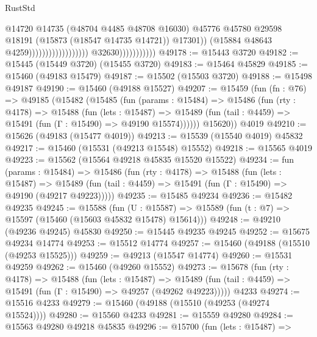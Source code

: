 \begin{lexlean}{RustStd}
\begin{coremodule}
                                                                @14720
                                                                @14735
                                                                (@48704 @4485 @48708 @16030)
                                                                @45776
                                                                @45780
                                                                @29598
                                                                @18191
                                                                (@15873 (@18547 @14735 @14721))
                                                                @17301))
                                                            (@15884 @48643 @4259))))))))))))))))))
                          @32630)))))))))))
@49178 := @15443 @3720
@49182 := @15445 (@15449 @3720) (@15455 @3720)
@49183 := @15464 @45829
@49185 := @15460 (@49183 @15479)
@49187 := @15502 (@15503 @3720)
@49188 := @15498 @49187
@49190 := @15460 (@49188 @15527)
@49207 := @15459
    (fun (fn : @76) =>
    @49185
      (@15482
        (@15485
          (fun (params : @15484) =>
          @15486
            (fun (rty : @4178) =>
            @15488
              (fun (lets : @15487) =>
              @15489 (fun (tail : @4459) => @15491 (fun (Γ : @15490) => @49190 @15574))))))
        @15620))
    @4019
@49210 := @15626 (@49183 (@15477 @4019))
@49213 := @15539 (@15540 @4019) @45832
@49217 := @15460 (@15531 (@49213 @15548) @15552)
@49218 := @15565 @4019
@49223 := @15562 (@15564 @49218 @45835 @15520 @15522)
@49234 := fun (params : @15484) =>
  @15486
    (fun (rty : @4178) =>
    @15488
      (fun (lets : @15487) =>
      @15489 (fun (tail : @4459) => @15491 (fun (Γ : @15490) => @49190 (@49217 @49223)))))
@49235 := @15485 @49234
@49236 := @15482 @49235
@49245 := @15588
    (fun (U : @15587) => @15589 (fun (t : @7) => @15597 (@15460 (@15603 @45832 @15478) @15614)))
@49248 := @49210 (@49236 @49245) @45830
@49250 := @15445 @49235 @49245
@49252 := @15675 @49234 @14774
@49253 := @15512 @14774
@49257 := @15460 (@49188 (@15510 (@49253 @15525)))
@49259 := @49213 (@15547 @14774)
@49260 := @15531 @49259
@49262 := @15460 (@49260 @15552)
@49273 := @15678
    (fun (rty : @4178) =>
    @15488
      (fun (lets : @15487) =>
      @15489 (fun (tail : @4459) => @15491 (fun (Γ : @15490) => @49257 (@49262 @49223)))))
    @4233
@49274 := @15516 @4233
@49279 := @15460 (@49188 (@15510 (@49253 (@49274 @15524))))
@49280 := @15560 @4233
@49281 := @15559 @49280
@49284 := @15563 @49280 @49218 @45835
@49296 := @15700
    (fun (lets : @15487) =>

\end{coremodule}
\end{lexlean}
